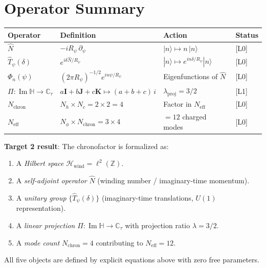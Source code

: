 \documentclass[12pt,a4paper]{article}
\theoremstyle{definition}
\theoremstyle{remark}
\begin{document}
\section{Operator Summary}
\label{sec:chron:summary}

\begin{center}
\renewcommand{\arraystretch}{1.4}
\begin{tabular}{llll}
\toprule
Operator & Definition & Action & Status \\
\midrule
$\hat{N}$ & $-iR_\psi\,\partial_\psi$ & $|n\rangle \mapsto n\,|n\rangle$ & [L0] \\
$\hat{T}_\psi(\delta)$ & $e^{i\delta\hat{N}/R_\psi}$ & $|n\rangle \mapsto e^{in\delta/R_\psi}|n\rangle$ & [L0] \\
$\Phi_n(\psi)$ & $(2\pi R_\psi)^{-1/2}e^{in\psi/R_\psi}$ & Eigenfunctions of $\hat{N}$ & [L0] \\
$\Pi: \operatorname{Im}\mathbb{H}\to\mathbb{C}_\tau$ & $a\mathbf{I}+b\mathbf{J}+c\mathbf{K}\mapsto(a+b+c)\,i$ & $\lambda_{\mathrm{proj}}=3/2$ & [L1] \\
$N_{\mathrm{chron}}$ & $N_h\times N_c = 2\times 2 = 4$ & Factor in $N_{\mathrm{eff}}$ & [L0] \\
$N_{\mathrm{eff}}$ & $N_\phi\times N_{\mathrm{chron}} = 3\times 4$ & $= 12$ charged modes & [L0] \\
\bottomrule
\end{tabular}
\end{center}

\begin{resultbox}
\textbf{Target 2 result}: The chronofactor is formalized as:
\begin{enumerate}
  \item A \emph{Hilbert space} $\mathcal{H}_{\mathrm{wind}} = \ell^2(\mathbb{Z})$.
  \item A \emph{self-adjoint operator} $\hat{N}$ (winding number / imaginary-time momentum).
  \item A \emph{unitary group} $\{\hat{T}_\psi(\delta)\}$ (imaginary-time translations, $U(1)$ representation).
  \item A \emph{linear projection} $\Pi: \operatorname{Im}\mathbb{H} \to \mathbb{C}_\tau$
        with projection ratio $\lambda = 3/2$.
  \item A \emph{mode count} $N_{\mathrm{chron}} = 4$ contributing to $N_{\mathrm{eff}} = 12$.
\end{enumerate}
All five objects are defined by explicit equations above with zero free parameters.
\end{resultbox}
\end{document}
